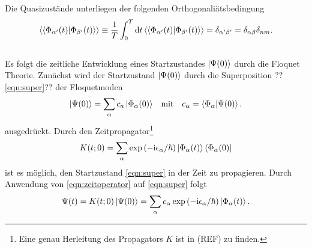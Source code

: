 Die Quasizustände unterliegen der folgenden Orthogonaliätsbedingung
\begin{align}
  \braket{\braket{\Phi_{\alpha' }(t)|\Phi_{\beta'}(t)}}\equiv \frac{1}{T} \int_0^T\mathrm{d}t
  \braket{\braket{\Phi_{\alpha' }(t)|\Phi_{\beta'}(t)}}=\delta_{\alpha'\beta'}=\delta_{\alpha\beta}\delta_{nm}. \label{eqn:orhto}
\end{align}
\\
Es folgt die zeitliche Entwicklung
eines Startzustandes $\ket{\Psi(0)}$
durch die Floquet Theorie.
Zunächst wird der Startzustand $\ket{\Psi(0)}$ durch
die Superposition ??\eqref{eqn:super}?? der Floquetmoden
\begin{align}
  \ket{\Psi(0)}=\sum_\alpha c_a\ket{\Phi_\alpha(0)}& &\text{mit}&  &c_\alpha=\braket{\Phi_\alpha|\Psi(0)}.  \label{eqn:super}
\end{align}
ausgedrückt.
Durch den Zeitpropagator\footnote{Eine genau Herleitung des Propagators $K$ ist in (REF) zu finden.}
\begin{align}
  K(t;0)=\sum_\alpha \exp\left(-\mathrm{i}\epsilon_\alpha/ \hbar \right)\ket{\Phi_\alpha(t)}\bra{\Phi_\alpha(0)} \label{eqn:zeitoperator}
\end{align}
ist es möglich, den Startzustand \eqref{eqn:super}
in der Zeit zu propagieren.
Durch Anwendung von \eqref{eqn:zeitoperator} auf \eqref{eqn:super}
folgt
\begin{align}
  \Psi(t)=K(t;0) \ket{\Psi(0)}=\sum_\alpha c_\alpha \exp\left(-\mathrm{i}\epsilon_\alpha/ \hbar \right)\ket{\Phi_\alpha(t)}. \label{eqn:psi_t}
\end{align}
%

